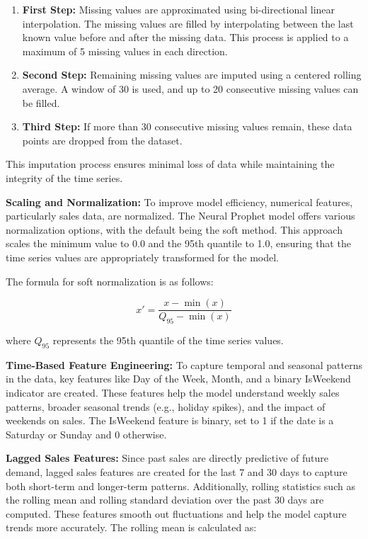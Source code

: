 \begin{enumerate}
    \item \textbf{First Step:} Missing values are approximated using bi-directional linear interpolation. The missing values are filled by interpolating between the last known value before and after the missing data. This process is applied to a maximum of 5 missing values in each direction.
    \item \textbf{Second Step:} Remaining missing values are imputed using a centered rolling average. A window of 30 is used, and up to 20 consecutive missing values can be filled.
    \item \textbf{Third Step:} If more than 30 consecutive missing values remain, these data points are dropped from the dataset.
\end{enumerate}

This imputation process ensures minimal loss of data while maintaining the integrity of the time series.

\textbf{Scaling and Normalization:} To improve model efficiency, numerical features, particularly sales data, are normalized. The Neural Prophet model offers various normalization options, with the default being the soft method. This approach scales the minimum value to 0.0 and the 95th quantile to 1.0, ensuring that the time series values are appropriately transformed for the model.

The formula for soft normalization is as follows:

\[
    x' = \frac{x - \min(x)}{Q_{95} - \min(x)}
\]

where \( Q_{95} \) represents the 95th quantile of the time series values.

\textbf{Time-Based Feature Engineering:} To capture temporal and seasonal patterns in the data, key features like Day of the Week, Month, and a binary IsWeekend indicator are created. These features help the model understand weekly sales patterns, broader seasonal trends (e.g., holiday spikes), and the impact of weekends on sales. The IsWeekend feature is binary, set to 1 if the date is a Saturday or Sunday and 0 otherwise.

\textbf{Lagged Sales Features:} Since past sales are directly predictive of future demand, lagged sales features are created for the last 7 and 30 days to capture both short-term and longer-term patterns. Additionally, rolling statistics such as the rolling mean and rolling standard deviation over the past 30 days are computed. These features smooth out fluctuations and help the model capture trends more accurately. The rolling mean is calculated as:


